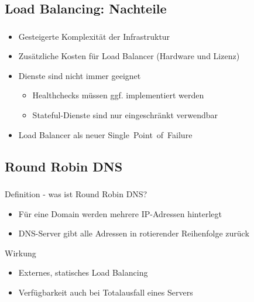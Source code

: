 \subsection{Load Balancing: Nachteile}
\begin{frame}
    \frametitle{\insertsection}
    \framesubtitle{\insertsubsection}

    \begin{itemize}
    	\item Gesteigerte Komplexität der Infrastruktur
    	\item Zusätzliche Kosten für Load Balancer (Hardware und Lizenz)%
    	\item Dienste sind nicht immer geeignet
		\begin{itemize}
			\item Healthchecks müssen ggf. implementiert werden
			\item Stateful-Dienste sind nur eingeschränkt verwendbar
		\end{itemize}
    	\item Load Balancer als neuer Single~Point~of~Failure
    \end{itemize}
\end{frame}



\subsection{Round Robin DNS}
\begin{frame}
    \frametitle{\insertsection}
    \framesubtitle{\insertsubsection}
    \begin{block}{Definition - was ist Round Robin DNS?}
    \begin{itemize}
        \item Für eine Domain werden mehrere IP-Adressen hinterlegt
        \item DNS-Server gibt alle Adressen in rotierender Reihenfolge zurück


    \end{itemize}
    \end{block}
    \begin{block}{Wirkung}
    	\begin{itemize}
    		\item Externes, statisches Load Balancing
    		\item Verfügbarkeit auch bei Totalausfall eines Servers
    	\end{itemize}
    \end{block}
\end{frame}

